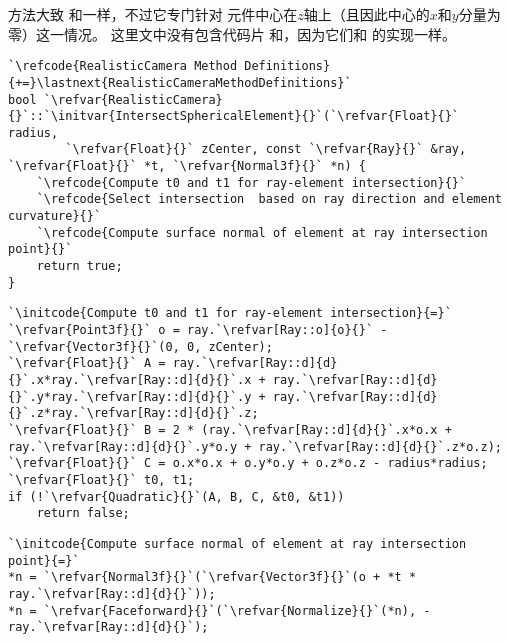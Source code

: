 方法大致
和一样，不过它专门针对
元件中心在$z$轴上（且因此中心的$x$和$y$分量为零）这一情况。
这里文中没有包含代码片
和，因为它们和
的实现一样。
\begin{lstlisting}
`\refcode{RealisticCamera Method Definitions}{+=}\lastnext{RealisticCameraMethodDefinitions}`
bool `\refvar{RealisticCamera}{}`::`\initvar{IntersectSphericalElement}{}`(`\refvar{Float}{}` radius,
        `\refvar{Float}{}` zCenter, const `\refvar{Ray}{}` &ray, `\refvar{Float}{}` *t, `\refvar{Normal3f}{}` *n) {
    `\refcode{Compute t0 and t1 for ray-element intersection}{}`
    `\refcode{Select intersection  based on ray direction and element curvature}{}`
    `\refcode{Compute surface normal of element at ray intersection point}{}`
    return true;
}
\end{lstlisting}
\begin{lstlisting}
`\initcode{Compute t0 and t1 for ray-element intersection}{=}`
`\refvar{Point3f}{}` o = ray.`\refvar[Ray::o]{o}{}` - `\refvar{Vector3f}{}`(0, 0, zCenter);
`\refvar{Float}{}` A = ray.`\refvar[Ray::d]{d}{}`.x*ray.`\refvar[Ray::d]{d}{}`.x + ray.`\refvar[Ray::d]{d}{}`.y*ray.`\refvar[Ray::d]{d}{}`.y + ray.`\refvar[Ray::d]{d}{}`.z*ray.`\refvar[Ray::d]{d}{}`.z;
`\refvar{Float}{}` B = 2 * (ray.`\refvar[Ray::d]{d}{}`.x*o.x + ray.`\refvar[Ray::d]{d}{}`.y*o.y + ray.`\refvar[Ray::d]{d}{}`.z*o.z);
`\refvar{Float}{}` C = o.x*o.x + o.y*o.y + o.z*o.z - radius*radius;
`\refvar{Float}{}` t0, t1;
if (!`\refvar{Quadratic}{}`(A, B, C, &t0, &t1))
    return false;
\end{lstlisting}
\begin{lstlisting}
`\initcode{Compute surface normal of element at ray intersection point}{=}`
*n = `\refvar{Normal3f}{}`(`\refvar{Vector3f}{}`(o + *t * ray.`\refvar[Ray::d]{d}{}`));
*n = `\refvar{Faceforward}{}`(`\refvar{Normalize}{}`(*n), -ray.`\refvar[Ray::d]{d}{}`);
\end{lstlisting}

